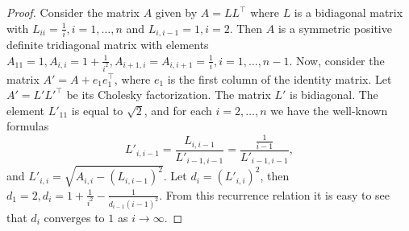 \documentclass[10pt,a4paper]{amsart}
\begin{document}
\begin{proof}
    Consider the matrix $A$ given by $A=LL^{\top}$ where $L$ is a bidiagonal matrix with $L_{ii} = \frac{1}{i}, i = 1, \ldots, n$ and
    $L_{i, i-1} = 1, i = 2$. Then $A$ is a symmetric positive definite tridiagonal matrix with elements $A_{11} = 1, A_{i, i} = 1 + \frac{1}{i^2}, 
    A_{i+1, i} = A_{i, i+1} = \frac{1}{i}, i = 1, \ldots, n-1$.
    Now, consider the matrix $A' = A + e_1 e_1^{\top}$, where $e_1$ is the first column of the identity matrix. Let
    $A' = L' L'^{\top}$ be its Cholesky factorization. The matrix $L'$ is bidiagonal. The element $L'_{11}$ is equal to $\sqrt{2}$,
    and for each $i=2, \ldots, n$ we have the well-known formulas 
    \begin{equation*}
      L'_{i, i-1} = \frac{L_{i, i-1}}{L'_{i-1, i-1}} = \frac{\frac{1}{i-1}}{L'_{i-1, i-1}},
    \end{equation*} 
    and $L'_{i, i} = \sqrt{A_{i, i} - \left( L_{i, i-1}\right)^2 }.$  Let $d_i = (L'_{i, i})^2$, then
    $d_1 = 2, d_i = 1 + \frac{1}{i^2} - \frac{1}{d_{i-1} (i-1)^2}$. From this recurrence relation it is easy to see that $d_i$
    converges to $1$ as $i \to \infty$.
\end{proof}
\end{document}
